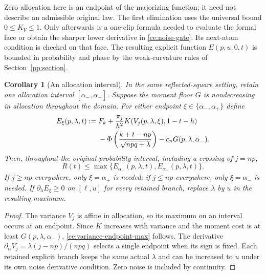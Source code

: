 \documentclass[aop,preprint]{imsart}
\newtheorem{corollary}[theorem]{Corollary}
\theoremstyle{definition}
\numberwithin{equation}{section}
\begin{document}
Zero allocation here is an endpoint of the majorizing function; it need
not describe an admissible original law. The first elimination uses the
universal bound $0\le K_V\le1$. Only afterwards is a one-clip formula
needed to evaluate the formal face or obtain the sharper lower derivative
in \eqref{ce:noise-gate}. Its next-atom condition is checked on that face.
The resulting explicit function $E(p,u,0,t)$ is bounded in probability
and phase by the weak-curvature rules of Section~\ref{pp:section}.

\begin{corollary}[An allocation interval]\label{ce:allocation-interval}
In the same reflected-square setting, retain one allocation interval
$[\alpha_-,\alpha_+]$. Suppose the moment floor $G$ is nondecreasing
in allocation throughout the domain. For either endpoint
$\xi\in\{\alpha_-,\alpha_+\}$ define
\begin{align}\label{ce:two-corners}
 E_{\xi}(p,\lambda,t):={}&F_k+
 \frac{\pi_j}{h^2}K(V_j(p,\lambda,\xi),1-t-h)\notag\\
 &-\Phi\left(\frac{k+t-np}{\sqrt{npq+\lambda}}\right)
 -c_nG(p,\lambda,\alpha_-).
\end{align}
Then, throughout the original probability interval, including a crossing
of $j=np$,
\begin{equation}\label{ce:variance-endpoint-max}
 R(t)\le\max\{E_{\alpha_-}(p,\lambda,t),
              E_{\alpha_+}(p,\lambda,t)\}.
\end{equation}
If $j\ge np$ everywhere, only $\xi=\alpha_+$ is needed;
if $j\le np$ everywhere, only $\xi=\alpha_-$ is needed.
If $\partial_\lambda E_\xi\ge0$ on $[\ell,u]$ for every retained
branch, replace $\lambda$ by $u$ in the resulting maximum.
\end{corollary}
\begin{proof}
The variance $V_j$ is affine in allocation, so its maximum on an
interval occurs at an endpoint. Since $K$ increases with variance
and the moment cost is at least $G(p,\lambda,\alpha_-)$,
\eqref{ce:variance-endpoint-max} follows. The derivative
$\partial_\alpha V_j=\lambda(j-np)/(npq)$ selects a single endpoint
when its sign is fixed. Each retained explicit branch keeps the
same actual $\lambda$ and can be increased to $u$ under its own
noise derivative condition. Zero noise is included by continuity.
\end{proof}
\end{document}
